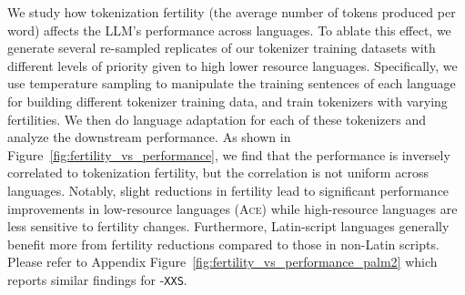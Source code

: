 We study how tokenization fertility (the average number of tokens produced per word) affects the LLM's performance across languages. 
To ablate this effect, we generate several re-sampled replicates of our tokenizer training datasets with different levels of priority given to high \versus lower resource languages. Specifically, we use temperature sampling to manipulate the training sentences of each language for building different tokenizer training data, and train tokenizers with varying fertilities. We then do language adaptation for each of these tokenizers and analyze the downstream performance. As shown in Figure~\ref{fig:fertility_vs_performance}, we find that the performance is inversely correlated to tokenization fertility, but the correlation is not uniform across languages. Notably, slight reductions in fertility lead to significant performance improvements in low-resource languages (\eg \textsc{Ace}) while high-resource languages are less sensitive to fertility changes.
Furthermore, Latin-script languages generally benefit more from fertility reductions compared to those in non-Latin scripts.
Please refer to Appendix Figure~\ref{fig:fertility_vs_performance_palm2} which reports similar findings for \palmtwo-\texttt{XXS}.


